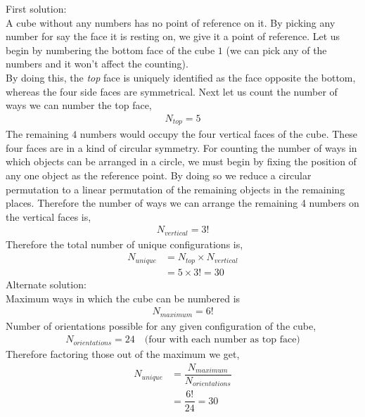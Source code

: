 \fi 

\begin{solution}[\halfpage]
  First solution: \\
  A cube without any numbers has no point of reference on it. By picking
  any number for say the face it is resting on, we give it a point of
  reference. Let us begin by numbering the bottom face of the cube $1$ 
  (we can pick any of the numbers and it won't affect the counting). \\
  By doing this, the \textit{top} face is uniquely identified as the face
  opposite the bottom, whereas the four side faces are symmetrical.
  Next let us count the number of ways we can number the top face,
  \begin{align}
     N_{top} = 5 \nonumber
  \end{align}
  The remaining $4$ numbers would occupy the four vertical faces of the cube.
  These four faces are in a kind of circular symmetry. For counting the number
  of ways in which objects can be arranged in a circle, we must begin by 
  fixing the position of any one object as the reference point.
  By doing so we reduce a circular permutation to a linear permutation of the
  remaining objects in the remaining places. Therefore the number of ways we
  can arrange the remaining 4 numbers on the vertical faces is,
  \begin{align}
     N_{vertical} = 3! \nonumber
  \end{align}
  Therefore the total number of unique configurations is,
  \begin{align}
    N_{unique} &= N_{top} \times N_{vertical} \nonumber \\
               &= 5 \times 3! = 30 \nonumber 
  \end{align}
  Alternate solution:\\
  Maximum ways in which the cube can be numbered is 
  \begin{align}
    N_{maximum} = 6! \nonumber
  \end{align}
  Number of orientations possible for any given configuration of the cube,
  \begin{align}
    N_{orientations} = 24 \quad\text{(four with each number as top face)} \nonumber
  \end{align}
  Therefore factoring those out of the maximum we get,
  \begin{align}
    N_{unique} &= \dfrac{N_{maximum}}{N_{orientations}} \nonumber \\
               &= \dfrac{6!}{24} = 30 \nonumber
  \end{align}   
\end{solution}

